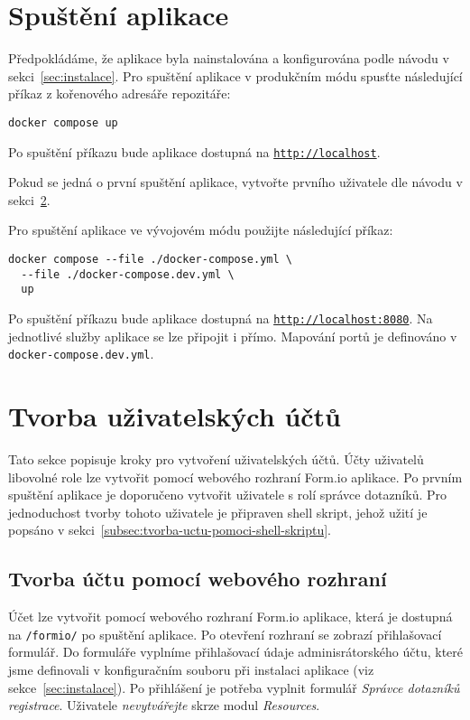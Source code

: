\section{Spuštění aplikace}\label{sec:spusteni-aplikace}

Předpokládáme, že aplikace byla nainstalována a konfigurována podle návodu v sekci~\ref{sec:instalace}.
Pro spuštění aplikace v produkčním módu spusťte následující příkaz z kořenového adresáře repozitáře:

\begin{verbatim}
docker compose up
\end{verbatim}

Po spuštění příkazu bude aplikace dostupná na \texttt{\href{http://localhost}{http://localhost}}.

Pokud se jedná o první spuštění aplikace, vytvořte prvního uživatele dle návodu v sekci~\ref{sec:tvorba-uzivatelskych-uctu}.

Pro spuštění aplikace ve vývojovém módu použijte následující příkaz:

\begin{verbatim}
docker compose --file ./docker-compose.yml \
  --file ./docker-compose.dev.yml \
  up
\end{verbatim}

Po spuštění příkazu bude aplikace dostupná na \texttt{\href{http://localhost:8080}{http://localhost:8080}}.
Na jednotlivé služby aplikace se lze připojit i přímo.
Mapování portů je definováno v \texttt{docker-compose.dev.yml}.


\section{Tvorba uživatelských účtů}\label{sec:tvorba-uzivatelskych-uctu}

Tato sekce popisuje kroky pro vytvoření uživatelských účtů.
Účty uživatelů libovolné role lze vytvořit pomocí webového rozhraní Form.io aplikace.
Po prvním spuštění aplikace je doporučeno vytvořit uživatele s rolí správce dotazníků.
Pro jednoduchost tvorby tohoto uživatele je připraven shell skript, jehož užití je popsáno v sekci~\ref{subsec:tvorba-uctu-pomoci-shell-skriptu}.

\subsection{Tvorba účtu pomocí webového rozhraní}\label{subsec:tvorba-uctu-pomoci-weboveho-rozhrani}

Účet lze vytvořit pomocí webového rozhraní Form.io aplikace, která je dostupná na \texttt{/formio/} po spuštění aplikace.
Po otevření rozhraní se zobrazí přihlašovací formulář.
Do formuláře vyplníme přihlašovací údaje adminisrátorského účtu, které jsme definovali v konfiguračním souboru při instalaci aplikace (viz sekce~\ref{sec:instalace}).
Po přihlášení je potřeba vyplnit formulář \textit{Správce dotazníků registrace}.
Uživatele \textit{nevytvářejte} skrze modul \textit{Resources}.

